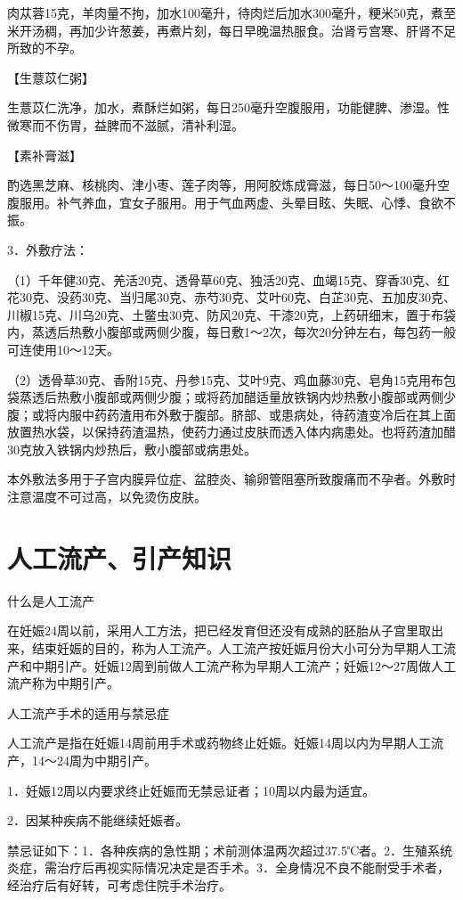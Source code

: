 \documentclass[12pt,UTF8,openany]{ctexbook}
\begin{document}
肉苁蓉15克，羊肉量不拘，加水100毫升，待肉烂后加水300毫升，粳米50克，煮至米开汤稠，再加少许葱姜，再煮片刻，每日早晚温热服食。治肾亏宫寒、肝肾不足所致的不孕。

【生薏苡仁粥】

生薏苡仁洗净，加水，煮酥烂如粥，每日250毫升空腹服用，功能健脾、渗湿。性微寒而不伤胃，益脾而不滋腻，清补利湿。

【素补膏滋】

酌选黑芝麻、核桃肉、津小枣、莲子肉等，用阿胶炼成膏滋，每日50～100毫升空腹服用。补气养血，宜女子服用。用于气血两虚、头晕目眩、失眠、心悸、食欲不振。

3．外敷疗法：

（1）千年健30克、羌活20克、透骨草60克、独活20克、血竭15克、穿香30克、红花30克、没药30克、当归尾30克、赤芍30克、艾叶60克、白芷30克、五加皮30克、川椒15克、川乌20克、土鳖虫30克、防风20克、干漆20克，上药研细末，置于布袋内，蒸透后热敷小腹部或两侧少腹，每日敷1～2次，每次20分钟左右，每包药一般可连使用10～12天。

（2）透骨草30克、香附15克、丹参15克、艾叶9克、鸡血藤30克、皂角15克用布包袋蒸透后热敷小腹部或两侧少腹；或将药加醋适量放铁锅内炒热敷小腹部或两侧少腹；或将内服中药药渣用布外敷于腹部。脐部、或患病处，待药渣变冷后在其上面放置热水袋，以保持药渣温热，使药力通过皮肤而透入体内病患处。也将药渣加醋30克放入铁锅内炒热后，敷小腹部或病患处。

本外敷法多用于子宫内膜异位症、盆腔炎、输卵管阻塞所致腹痛而不孕者。外敷时注意温度不可过高，以免烫伤皮肤。

\chapter{人工流产、引产知识}


什么是人工流产


在妊娠24周以前，采用人工方法，把已经发育但还没有成熟的胚胎从子宫里取出来，结束妊娠的目的，称为人工流产。人工流产按妊娠月份大小可分为早期人工流产和中期引产。妊娠12周到前做人工流产称为早期人工流产；妊娠12～27周做人工流产称为中期引产。





人工流产手术的适用与禁忌症


人工流产是指在妊娠14周前用手术或药物终止妊娠。妊娠14周以内为早期人工流产，14～24周为中期引产。

1．妊娠12周以内要求终止妊娠而无禁忌证者；10周以内最为适宜。

2．因某种疾病不能继续妊娠者。

禁忌证如下：1．各种疾病的急性期；术前测体温两次超过37.5℃者。2．生殖系统炎症，需治疗后再视实际情况决定是否手术。3．全身情况不良不能耐受手术者，经治疗后有好转，可考虑住院手术治疗。
\end{document}
